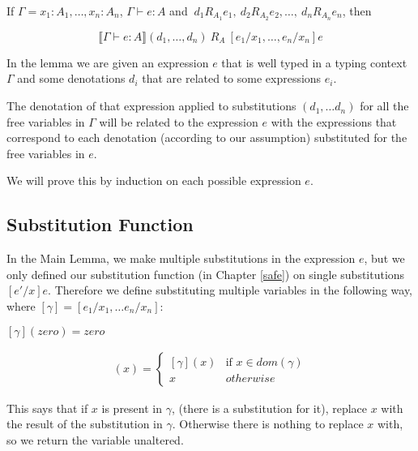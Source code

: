 \vspace{0.5cm}

\begin{lem} \label{main}
If $\Gamma = x_1 : A_1, \dots, x_n : A_n$, $\Gamma \vdash e : A$ and $ \ d_1 R_{A_1} e_1, \ d_2 R_{A_2} e_2, \dots , \  d_n   R_{A_n} e_n$, then

\[ \llbracket \Gamma \vdash e : A \rrbracket (d_1, \dots, d_n)  \ R_A \  [e_1/x_1, \dots, e_n/x_n]e \]
\end{lem}

In the lemma we are given an expression $e$ that is well typed in a typing context $\Gamma$ and some denotations $d_i$ that are related to some expressions $e_i$.

The denotation of that expression applied to substitutions $(d_1, \dots d_n)$ for all the  free variables in $\Gamma$ will be related to the expression $e$ with the expressions that correspond to each denotation (according to our assumption) substituted for the free variables in $e$.

We will prove this by induction on each possible expression $e$.

\subsection{Substitution Function}
In the Main Lemma, we make multiple substitutions in the expression $e$, but we only defined our substitution function (in Chapter \ref{safe}) on single substitutions $[e'/x]e$. Therefore we define substituting multiple variables in the following way, where $[\gamma] = [e_1/x_1, \dots e_n/x_n]$:

\begin{adjustwidth}{2cm}{}
$[\gamma](zero) = zero$
\end{adjustwidth}

\begin{minipage}{3.5in}
\begin{align*}
[\gamma](x) = 
  \begin{cases} 
           [\gamma](x) & \text{if } x \in dom(\gamma) \\
           x & otherwise 
  \end{cases}
\end{align*} 
\end{minipage}

This says that if $x$ is present in $\gamma$, (there is a substitution for it), replace $x$ with the result of the substitution in $\gamma$. Otherwise there is nothing to replace $x$ with, so we return the variable unaltered. 

